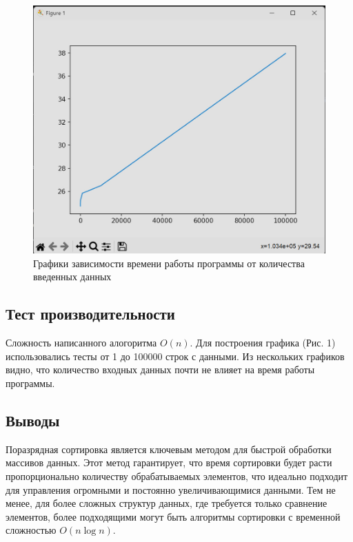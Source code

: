 \documentclass[12pt]{article}
\begin{document}
\newpage

\begin{figure}
    \centering
    \includegraphics[width=\textwidth]{graph.png}
    \caption{Графики зависимости времени работы программы от количества введенных данных}
\end{figure}

\subsection*{Тест производительности}

Сложность написанного алогоритма $O(n)$. Для построения графика (Рис. 1) использовались тесты от 1 до 100000 строк с данными.
Из нескольких графиков видно, что количество входных данных почти не влияет на время работы программы.

\newpage
\subsection*{Выводы}

Поразрядная сортировка является ключевым методом для быстрой обработки массивов данных.
Этот метод гарантирует, что время сортировки будет расти пропорционально количеству обрабатываемых элементов, что идеально подходит для управления огромными и постоянно увеличивающимися данными.
Тем не менее, для более сложных структур данных, где требуется только сравнение элементов, более подходящими могут быть алгоритмы сортировки с временной сложностью $O(n \log n)$.
\end{document}
